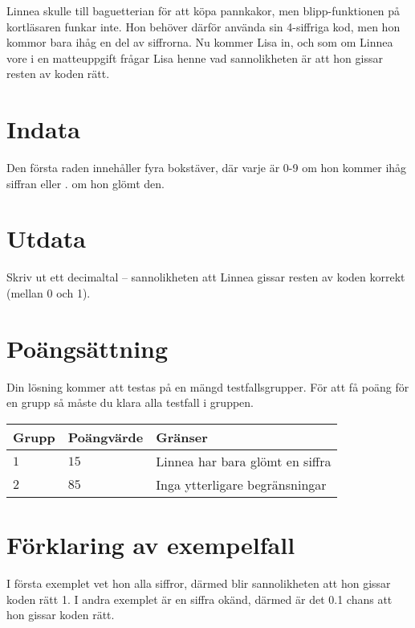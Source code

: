Linnea skulle till baguetterian för att köpa pannkakor, men blipp-funktionen på kortläsaren funkar inte.
Hon behöver därför använda sin 4-siffriga kod, men hon kommor bara ihåg en del av siffrorna.
Nu kommer Lisa in, och som om Linnea vore i en matteuppgift frågar Lisa henne vad sannolikheten är att hon gissar resten av koden rätt.   


\section*{Indata}
Den första raden innehåller fyra bokstäver, där varje är 0-9 om hon kommer ihåg siffran eller . om hon glömt den.

\section*{Utdata}
Skriv ut ett decimaltal -- sannolikheten att Linnea gissar resten av koden korrekt (mellan 0 och 1).

\section*{Poängsättning}
Din lösning kommer att testas på en mängd testfallsgrupper.
För att få poäng för en grupp så måste du klara alla testfall i gruppen.

\noindent
\begin{tabular}{| l | l | p{12cm} |}
  \hline
  Grupp & Poängvärde & Gränser \\ \hline
  $1$   & $15$       & Linnea har bara glömt en siffra \\ \hline
  $2$   & $85$       & Inga ytterligare begränsningar  \\ \hline
\end{tabular}

\section*{Förklaring av exempelfall}
I första exemplet vet hon alla siffror, därmed blir sannolikheten att hon gissar koden rätt 1.
I andra exemplet är en siffra okänd, därmed är det 0.1 chans att hon gissar koden rätt.